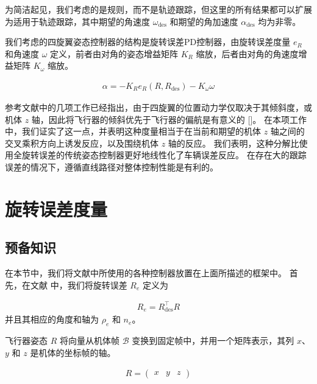 \documentclass[conference]{IEEEtran}
\begin{document}
为简洁起见，我们考虑的是规则，而不是轨迹跟踪，但这里的所有结果都可以扩展为适用于轨迹跟踪，其中期望的角速度 $\omega_{\text{des}}$ 和期望的角加速度 $\alpha_{\text{des}}$ 均为非零。

我们考虑的四旋翼姿态控制器的结构是旋转误差PD控制器，由旋转误差度量 $e_R$ 和角速度 $\omega$ 定义，前者由对角的姿态增益矩阵 $K_R$ 缩放，后者由对角的角速度增益矩阵 $K_\omega$ 缩放。

\newcommand{\Rdes}{R_{\text{des}}}
\newcommand{\zdes}{z_{\text{des}}}

\begin{align}
  \alpha = -K_R e_R(R, \Rdes) - K_\omega \omega
\end{align}

参考文献中的几项工作已经指出，由于四旋翼的位置动力学仅取决于其倾斜度，或机体 $z$ 轴，因此将飞行器的倾斜优先于飞行器的偏航是有意义的 []。
在本项工作中，我们证实了这一点，并表明这种度量相当于在当前和期望的机体 $z$ 轴之间的交叉乘积方向上诱发反应，以及围绕机体 $z$ 轴的反应。
我们表明，这种分解比使用全旋转误差的传统姿态控制器更好地线性化了车辆误差反应。
在存在大的跟踪误差的情况下，遵循直线路径对整体控制性能是有利的。


\section{旋转误差度量}

\subsection{预备知识}

在本节中，我们将文献中所使用的各种控制器放置在上面所描述的框架中。
首先，在文献 \citet{mueller_multicopter_2018} 中，我们将旋转误差 $R_e$ 定义为 

\begin{align}
  R_e = \Rdes^\top R
\end{align}
并且其相应的角度和轴为 $\rho_e$ 和 $n_e$。

飞行器姿态 $R$ 将向量从机体帧 $\mathcal B$ 变换到固定帧中，并用一个矩阵表示，其列 $x$、$y$ 和 $z$ 是机体的坐标帧的轴。

\begin{align}
  R = \begin{pmatrix} x & y & z \end{pmatrix}
\end{align}
\end{document}
